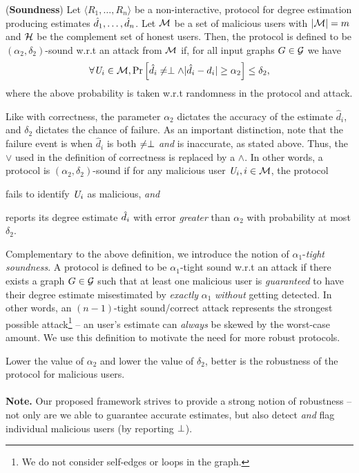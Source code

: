 \begin{defn}\label{chap4-def:sound}(\textbf{Soundness}) Let $\langle R_1, \ldots, R_n\rangle$ be a non-interactive, \ldp{} protocol for degree estimation producing estimates $\hat{d}_1, \ldots, \hat{d}_n$. Let $\mathcal{M}$ be a set of malicious users with $|\mathcal{M}| = m$ and $\mathcal{H}$ be the complement set of honest users. Then, the protocol is defined to be $(\alpha_2, \delta_2)$-sound w.r.t an attack from $\mathcal{M}$ if, for all input graphs $G \in \mathcal{G}$ we have
  \begin{gather}
    \forall \textit{U}_i \in \mathcal{M}, \mathrm{Pr}\left[\hat{d}_i \neq \perp \wedge |\hat{d}_i -
    d_i| \geq \alpha_2\right]\leq \delta_2, \label{chap4-eq:sound1}
  \end{gather}
  where the above probability is taken w.r.t randomness in the protocol and attack.
\end{defn}
Like with correctness, the parameter $\alpha_2$ dictates the accuracy of the estimate $\hat{d}_i$, and $\delta_2$ dictates the chance of failure. As an important distinction, note that the failure event is when $\hat{d}_i$ is both $\neq \perp$ \textit{and} is inaccurate, as stated above. Thus, the $\vee$ used in the definition of correctness is replaced by a $\wedge$. In other words, a protocol is $(\alpha_2,\delta_2)$-sound if for any malicious user $\textit{U}_i, i \in \mathcal{M}$, the protocol \squishlist \item fails to identify $\textit{U}_i$ as malicious, \textit{and} \item reports its degree estimate $\hat{d}_i$ with error \textit{greater} than $\alpha_2$ \squishend  with probability at most $\delta_2$.

Complementary to the above definition, we introduce the notion of $\alpha_1$-\textit{tight soundness}. A protocol is defined to be $\alpha_1$-tight sound w.r.t an attack if there exists a graph $G \in \mathcal{G}$ such that at least one malicious user is \textit{guaranteed} to have their degree estimate misestimated by \textit{exactly} $\alpha_1$ \textit{without} getting detected.  %
In other words, an $(n-1)$-tight sound/correct attack represents the strongest possible attack\footnote{We do not consider self-edges or loops in the graph.} -- an user's estimate can \textit{always} be skewed by the worst-case amount. We use this definition to motivate the need for more robust protocols. %
\par Lower the value of
$\alpha_2$ and lower the value of $\delta_2$, better is the robustness of the protocol for malicious users.  
    \\\\
\noindent\textbf{Note.} Our proposed  framework strives to provide a strong notion of robustness -- not only are we able to guarantee accurate estimates, but also detect  \textit{and} flag individual malicious users (by reporting $\perp$). %
